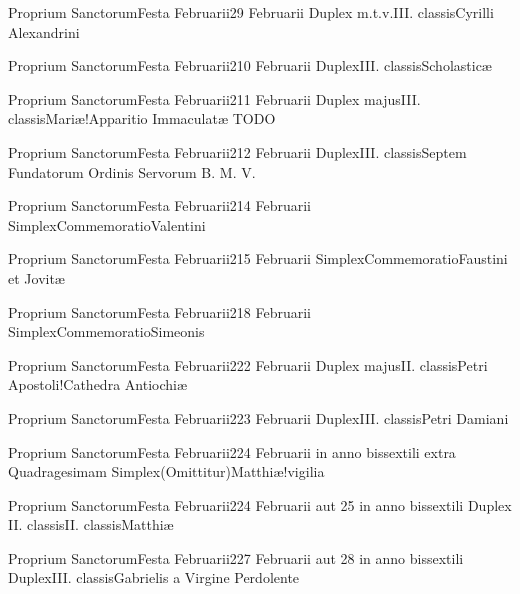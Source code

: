 \documentclass[liber-responsorialis.tex]{subfiles}
\begin{document}
	{Proprium Sanctorum}{Festa Februarii}{2}{9 Februarii}
	{Duplex m.t.v.}{III. classis}{Cyrilli Alexandrini}
	{\copodorubric}
	{\respdetemp}

	{Proprium Sanctorum}{Festa Februarii}{2}{10 Februarii}
	{Duplex}{III. classis}{Scholasticæ}
	{\vnrubric}
	{\respdetemp}

	{Proprium Sanctorum}{Festa Februarii}{2}{11 Februarii}
	{Duplex majus}{III. classis}{Mariæ!Apparitio Immaculatæ}
	{}
	{TODO}

	{Proprium Sanctorum}{Festa Februarii}{2}{12 Februarii}
	{Duplex}{III. classis}{Septem Fundatorum Ordinis Servorum B. M. V.}
	{\conprubric}
	{\respdetemp}

	{Proprium Sanctorum}{Festa Februarii}{2}{14 Februarii}
	{Simplex}{Commemoratio}{Valentini}
	{}
	{}
\rubric{\respdetemp}

	{Proprium Sanctorum}{Festa Februarii}{2}{15 Februarii}
	{Simplex}{Commemoratio}{Faustini et Jovitæ}
	{}
	{}
\rubric{\respdetemp}

	{Proprium Sanctorum}{Festa Februarii}{2}{18 Februarii}
	{Simplex}{Commemoratio}{Simeonis}
	{}
	{}
\rubric{\respdetemp}

	{Proprium Sanctorum}{Festa Februarii}{2}{22 Februarii}
	{Duplex majus}{II. classis}{Petri Apostoli!Cathedra Antiochiæ}
	{}
	{}

	{Proprium Sanctorum}{Festa Februarii}{2}{23 Februarii}
	{Duplex}{III. classis}{Petri Damiani}
	{\copodorubric}
	{\respdetemp}

	{Proprium Sanctorum}{Festa Februarii}{2}{24 Februarii in anno bissextili extra Quadragesimam}
	{Simplex}{(Omittitur)}{Matthiæ!vigilia}
	{}
	{}
\rubric{\respdetemp}

	{Proprium Sanctorum}{Festa Februarii}{2}{24 Februarii aut 25 in anno bissextili}
	{Duplex II. classis}{II. classis}{Matthiæ}
	{}
	{}
\rubric{\apexrubric}

	{Proprium Sanctorum}{Festa Februarii}{2}{27 Februarii aut 28 in anno bissextili}
	{Duplex}{III. classis}{Gabrielis a Virgine Perdolente}
	{\conprubric}
	{\respdetemp}
\end{document}
